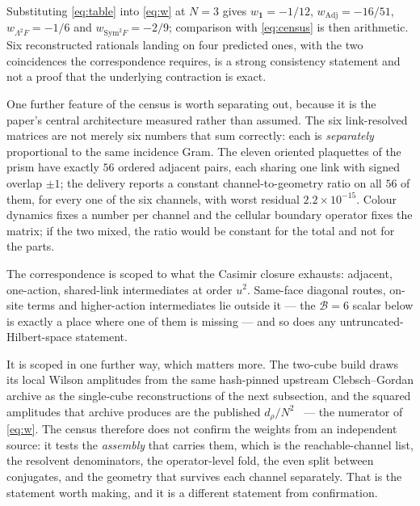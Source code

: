 \documentclass[11pt]{article}
\theoremstyle{plain}
\theoremstyle{definition}
\theoremstyle{remark}
\newcommand{\chk}[1]{}
\begin{document}
\noindent Substituting \eqref{eq:table} into \eqref{eq:w} at $N=3$ gives
$w_{\mathbf 1}=-1/12$, $w_{\mathrm{Adj}}=-16/51$, $w_{\Lambda^2F}=-1/6$ and
$w_{\mathrm{Sym}^2F}=-2/9$; comparison with \eqref{eq:census} is then
arithmetic. Six reconstructed rationals landing on four predicted ones, with
the two coincidences the correspondence requires, is a strong consistency
statement and not a proof that the underlying contraction is exact.
\chk{the B=6 six-channel census IS the Weingarten four-channel ledger, channel by channel}

One further feature of the census is worth separating out, because it is the
paper's central architecture measured rather than assumed. The six
link-resolved matrices are not merely six numbers that sum correctly: each is
\emph{separately} proportional to the same incidence Gram. The eleven oriented
plaquettes of the prism have exactly $56$ ordered adjacent pairs, each sharing
one link with signed overlap $\pm1$; the delivery reports a constant
channel-to-geometry ratio on all $56$ of them, for every one of the six
channels, with worst residual $2.2\times10^{-15}$. Colour dynamics fixes a
number per channel and the cellular boundary operator fixes the matrix; if the
two mixed, the ratio would be constant for the total and not for the parts.
\chk{every shared-link channel is separately proportional to the geometry, on all 56 pairs}

The correspondence is scoped to what the Casimir closure exhausts: adjacent,
one-action, shared-link intermediates at order $u^2$. Same-face diagonal
routes, on-site terms and higher-action intermediates lie outside it --- the
$\mathcal B=6$ scalar below is exactly a place where one of them is missing --- and so
does any untruncated-Hilbert-space statement.

It is scoped in one further way, which matters more. The two-cube build draws
its local Wilson amplitudes from the same hash-pinned upstream
Clebsch--Gordan archive as the single-cube reconstructions of the next
subsection, and the squared amplitudes that archive produces are the published
$d_\rho/N^2$~\cite{CBB2025} --- the numerator of \eqref{eq:w}. The census
therefore does not confirm the weights from an independent source: it tests the
\emph{assembly} that carries them, which is the reachable-channel list, the
resolvent denominators, the operator-level fold, the even split between
conjugates, and the geometry that survives each channel separately. That is the
statement worth making, and it is a different statement from confirmation.
\end{document}

